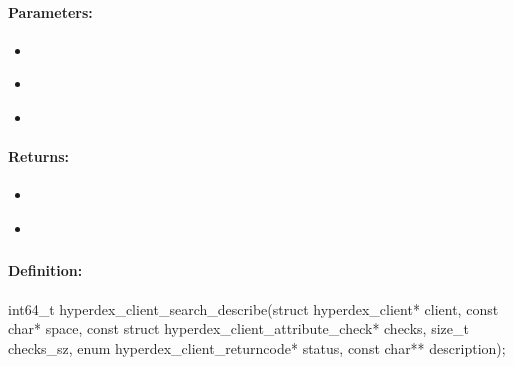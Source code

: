 \paragraph{Parameters:}
\begin{itemize}[noitemsep]
\item {}\\

\item {}\\

\item {}\\

\end{itemize}

\paragraph{Returns:}
\begin{itemize}[noitemsep]
\item {}\\

\item {}\\

\end{itemize}

\pagebreak
\subsubsection{}
\label{api:c:search_describe}


\paragraph{Definition:}
\begin{ccode}
int64_t hyperdex_client_search_describe(struct hyperdex_client* client,
        const char* space,
        const struct hyperdex_client_attribute_check* checks, size_t checks_sz,
        enum hyperdex_client_returncode* status,
        const char** description);
\end{ccode}

